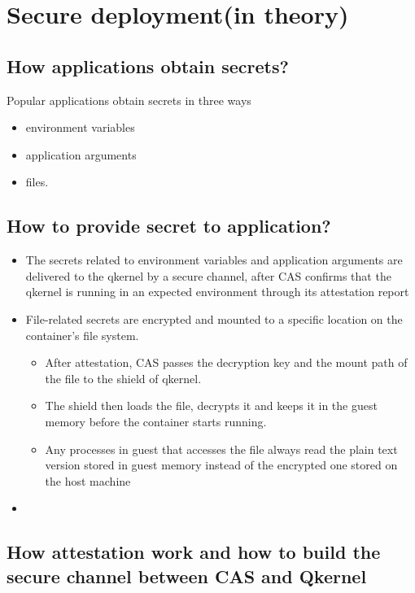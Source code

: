 \section{Secure deployment(in theory)}
\label{Secure_deployment}

\subsection{How applications obtain secrets?}

Popular applications obtain secrets in three ways
\begin{itemize}
    \item  environment variables
    \item  application arguments
    \item  files.
\end{itemize}

\subsection{How to provide secret to application?}

\begin{itemize}
    \item  The secrets related to environment variables and application arguments are  delivered to the qkernel by a secure channel, after CAS confirms that the qkernel is running in an expected environment through its attestation report
    \item  File-related secrets are encrypted and mounted to a specific location on the container's file system.
    \begin{itemize}
        \item After attestation, CAS passes the decryption key and the mount path of the file to the shield of qkernel.
        \item The shield then loads the file, decrypts it and keeps it in the guest memory before the container starts running.
        \item Any processes in guest that accesses the file always read the plain text version stored in guest memory instead of the encrypted one stored on the host machine
      \end{itemize}
    \item
\end{itemize}

\subsection{How attestation work and how to build the secure channel between CAS and Qkernel}

